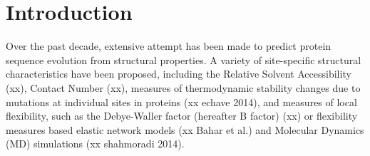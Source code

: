 \documentclass[11pt]{article}
\newenvironment{Abstract}{\begin{quotation}  }{\end{quotation}}
\begin{document}
\begin{titlepage}
\begin{Abstract}
\end{Abstract}
\vfill
\vfill
\end{titlepage}
\def\thefootnote{\fnsymbol{footnote}}
\setcounter{footnote}{0}
%

\section{Introduction}
\label{sec:intro}

    Over the past decade, extensive attempt has been made to predict protein sequence evolution from structural properties.  A variety of site-specific structural characteristics have been proposed, including the Relative Solvent Accessibility (xx), Contact Number (xx), measures of thermodynamic stability changes due to mutations at individual sites in proteins (xx echave 2014), and measures of local flexibility, such as the Debye-Waller factor (hereafter B factor) (xx) or flexibility measures based elastic network models (xx Bahar et al.) and Molecular Dynamics (MD) simulations (xx shahmoradi 2014). \\
\end{document}
